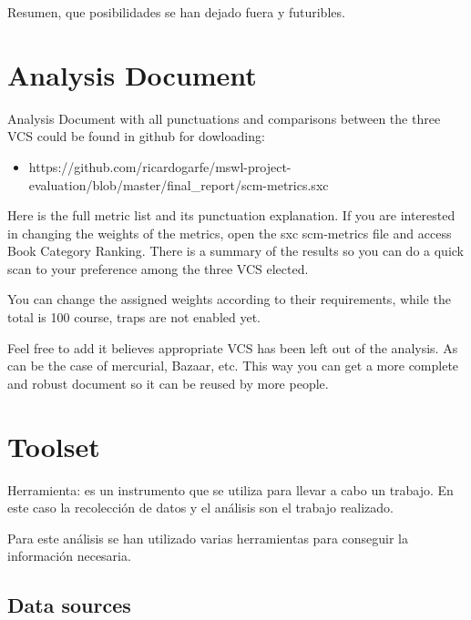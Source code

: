 \documentclass[11pt]{scrartcl}
\begin{document}
Resumen, que posibilidades se han dejado fuera y futuribles.

\section{Analysis Document}

Analysis Document with all punctuations and comparisons between the three VCS could be found in github for dowloading:
\begin{itemize}
    \item https://github.com/ricardogarfe/mswl-project-evaluation/blob/master/final\_report/scm-metrics.sxc
\end{itemize}

Here is the full metric list and its punctuation explanation. If you are interested in changing the weights of the metrics, open the sxc scm-metrics file and access Book Category Ranking. There is a summary of the results so you can do a quick scan to your preference among the three VCS elected.

\par You can change the assigned weights according to their requirements, while the total is 100 course, traps are not enabled yet.

\par Feel free to add it believes appropriate VCS has been left out of the analysis. As can be the case of mercurial, Bazaar, etc. This way you can get a more complete and robust document so it can be reused by more people.

\section{Toolset}

\par Herramienta: es un instrumento que se utiliza para llevar a cabo un trabajo. En este caso la recolección de datos y el análisis son el trabajo realizado.

\par Para este análisis se han utilizado varias herramientas para conseguir la información necesaria.

\subsection{Data sources}
\end{document}
